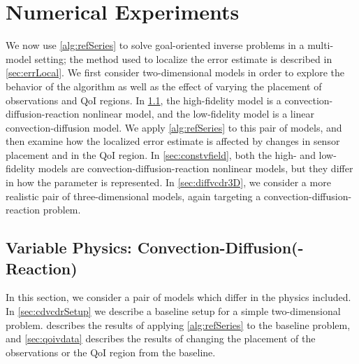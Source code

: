 \section{Numerical Experiments}\label{sec:numexp}
%
We now use \cref{alg:refSeries} to solve goal-oriented inverse problems in a multi-model setting; the method used to localize the error estimate is described in \cref{sec:errLocal}. We first consider two-dimensional models in order to explore the behavior of the algorithm as well as the effect of varying the placement of observations and QoI regions. In \cref{sec:cdvcdr}, the high-fidelity model is a convection-diffusion-reaction nonlinear model, and the low-fidelity model is a linear convection-diffusion model. We apply \cref{alg:refSeries} to this pair of models, and then examine how the localized error estimate is affected by changes in sensor placement and in the QoI region. In \cref{sec:constvfield}, both the high- and low-fidelity models are convection-diffusion-reaction nonlinear models, but they differ in how the parameter is represented. In \cref{sec:diffvcdr3D}, we consider a more realistic pair of three-dimensional models, again targeting a convection-diffusion-reaction problem.


\subsection{Variable Physics: Convection-Diffusion(-Reaction)} \label{sec:cdvcdr}
In this section, we consider a pair of models which differ in the physics included. In \cref{sec:cdvcdrSetup} we describe a baseline setup for a simple two-dimensional problem.  describes the results of applying \cref{alg:refSeries} to the baseline problem, and \cref{sec:qoivdata} describes the results of changing the placement of the observations or the QoI region from the baseline.
%
